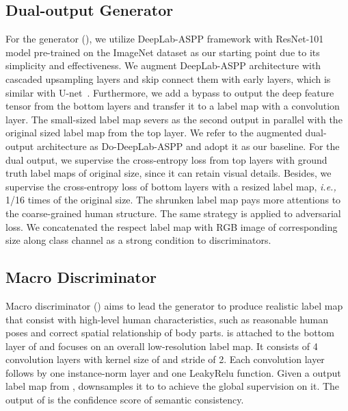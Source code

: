 \documentclass[runningheads]{llncs}
\begin{document}
\subsection{Dual-output Generator}\label{sec:baseline}
For the generator (), we utilize DeepLab-ASPP \cite{chen2016deeplab} framework with ResNet-101 \cite{he2016deep} model pre-trained on the ImageNet dataset \cite{deng2009imagenet} as our starting point due to its simplicity and effectiveness. We augment DeepLab-ASPP architecture with cascaded upsampling layers and skip connect them with early layers, which is similar with U-net~\cite{ronneberger2015u}. Furthermore, we add a bypass to output the deep feature tensor from the bottom layers and transfer it to a label map with a convolution layer. The small-sized label map severs as the second output in parallel with the original sized label map from the top layer. We refer to the augmented dual-output architecture as Do-DeepLab-ASPP and adopt it as our baseline. For the dual output, we supervise the cross-entropy loss from top layers with ground truth label maps of original size, since it can retain visual details. Besides, we supervise the cross-entropy loss of bottom layers with a resized label map, \emph{i.e.,} 1/16 times of the original size. The shrunken label map pays more attentions to the coarse-grained human structure. The same strategy is applied to adversarial loss. We concatenated the respect label map with RGB image of corresponding size along class channel as a strong condition to discriminators.

\subsection{Macro Discriminator} \label{sec:ma}
Macro discriminator () aims to lead the generator to produce realistic label map that consist with high-level human characteristics, such as reasonable human poses and correct spatial relationship of body parts.  is attached to the bottom layer of  and focuses on an overall low-resolution label map. It consists of 4 convolution layers with kernel size of  and stride of 2. Each convolution layer follows by one instance-norm layer and one LeakyRelu function. Given a output label map from ,  downsamples it to  to achieve the global supervision on it. The output of  is the confidence score of semantic consistency.
\end{document}
